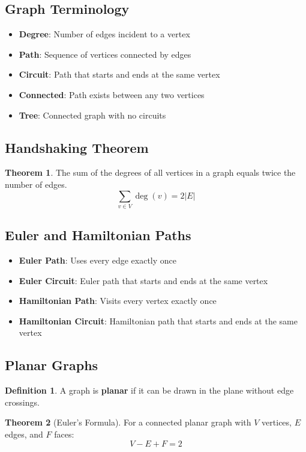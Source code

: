 \documentclass[11pt]{article}
\theoremstyle{definition}
\newtheorem{definition}{Definition}[section]
\newtheorem{theorem}{Theorem}[section]
\begin{document}
\subsection{Graph Terminology}
\begin{itemize}
    \item \textbf{Degree}: Number of edges incident to a vertex
    \item \textbf{Path}: Sequence of vertices connected by edges
    \item \textbf{Circuit}: Path that starts and ends at the same vertex
    \item \textbf{Connected}: Path exists between any two vertices
    \item \textbf{Tree}: Connected graph with no circuits
\end{itemize}

\subsection{Handshaking Theorem}
\begin{theorem}
The sum of the degrees of all vertices in a graph equals twice the number of edges.
$$\sum_{v \in V} \deg(v) = 2|E|$$
\end{theorem}

\subsection{Euler and Hamiltonian Paths}
\begin{itemize}
    \item \textbf{Euler Path}: Uses every edge exactly once
    \item \textbf{Euler Circuit}: Euler path that starts and ends at the same vertex
    \item \textbf{Hamiltonian Path}: Visits every vertex exactly once
    \item \textbf{Hamiltonian Circuit}: Hamiltonian path that starts and ends at the same vertex
\end{itemize}

\subsection{Planar Graphs}
\begin{definition}
A graph is \textbf{planar} if it can be drawn in the plane without edge crossings.
\end{definition}

\begin{theorem}[Euler's Formula]
For a connected planar graph with $V$ vertices, $E$ edges, and $F$ faces:
$$V - E + F = 2$$
\end{theorem}
\end{document}
